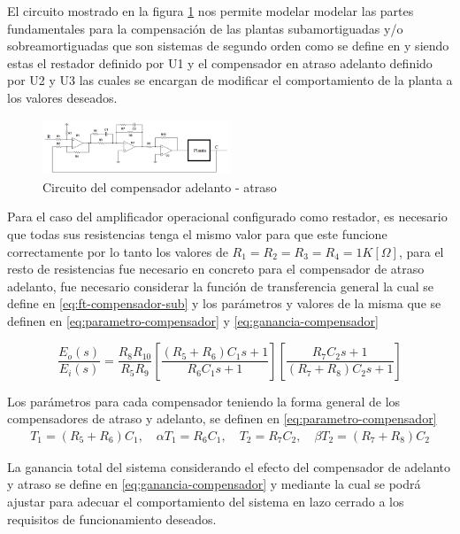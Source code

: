 \documentclass[conference]{IEEEtran}
\begin{document}
	 El circuito mostrado en la figura \ref{fig:circuito-adelanto-atraso} nos permite modelar modelar las partes fundamentales para la compensación de las plantas subamortiguadas y/o sobreamortiguadas que son sistemas de segundo orden como se define en \cite{ogata2015} y siendo estas el restador definido por U1 y el compensador en atraso adelanto definido por U2 y U3 las cuales se encargan de modificar el comportamiento de la planta a los valores deseados.
	 
	 \begin{figure}[h]
	 	\centering
	 	\includegraphics[width=0.5\textwidth]{media/circuito-adelanto-atraso}
	 	\caption{Circuito del compensador adelanto - atraso}
	 	\label{fig:circuito-adelanto-atraso}
	 \end{figure}
	 
	     
	 Para el caso del amplificador operacional configurado como restador, es necesario que todas sus resistencias tenga el mismo valor para que este funcione correctamente por lo tanto los valores de $R_1 = R_2 = R_3 = R_4 = 1K [\Omega]$, para el resto de resistencias fue necesario en concreto para el compensador de atraso adelanto, fue necesario considerar la función de transferencia general la cual se define en \ref{eq:ft-compensador-sub} y los parámetros y valores de la misma que se definen en \ref{eq:parametro-compensador} y \ref{eq:ganancia-compensador}
	 
	 \begin{equation}
	 	\frac{E_o(s)}{E_i(s)} = \frac{R_8 R_{10}}{R_5 R_9} \left[ \frac{(R_5 + R_6)C_1s + 1}{R_6C_1s + 1} \right] \left[ \frac{R_7C_2s + 1}{(R_7 + R_8)C_2s + 1} \right]
	 	\label{eq:ft-compensador-general}
	 \end{equation}
	 
	 Los parámetros para cada compensador teniendo la forma general de los compensadores de atraso y adelanto, se definen en \ref{eq:parametro-compensador}
	 \begin{align}
	 	T_1 = (R_5 + R_6)C_1, \quad \alpha T_1 = R_6C_1, \quad T_2 = R_7C_2, \quad \beta T_2 = (R_7 + R_8)C_2
	 	\label{eq:parametro-compensador}
	 \end{align}
	 
	 La ganancia total del sistema considerando el efecto del compensador de adelanto y atraso se define en \ref{eq:ganancia-compensador} y mediante la cual se podrá ajustar para adecuar el comportamiento del sistema en lazo cerrado a los requisitos de funcionamiento deseados.
	 
\end{document}
